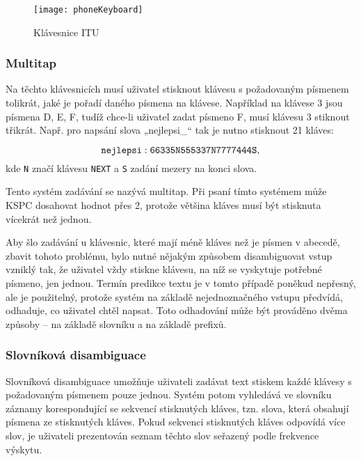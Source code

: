 \documentclass[a4paper,11pt]{article}
\begin{document}
\begin{figure}[h]
	\centering
	\texttt{[image: phoneKeyboard]}
	\caption{Klávesnice ITU}
	\label{fig:phoneKeyboard}
\end{figure}

\subsubsection{Multitap}

Na těchto klávesnicích musí uživatel stisknout klávesu s požadovaným písmenem tolikrát, jaké je pořadí daného písmena na klávese. Například na klávese 3 jsou písmena D, E, F, tudíž chce-li uživatel zadat písmeno F, musí klávesu 3 stiknout třikrát. Např. pro napsání slova „nejlepsi\_“ tak je nutno stisknout 21 kláves:

\[
	{\tt nejlepsi: 66335N555337N7777444S},
\]
kde {\tt N} značí klávesu {\tt NEXT} a {\tt S} zadání mezery na konci slova.

Tento systém zadávání se nazývá multitap. Při psaní tímto systémem může KSPC dosahovat hodnot přes 2, protože většina kláves musí být stisknuta vícekrát než jednou. \parencite[202]{mackenzie2002kspc}

Aby šlo zadávání u klávesnic, které mají méně kláves než je písmen v abecedě, zbavit tohoto problému, bylo nutné nějakým způsobem disambiguovat vstup vzniklý tak, že uživatel vždy stiskne klávesu, na níž se vyskytuje potřebné písmeno, jen jednou. Termín predikce textu je v tomto případě poněkud nepřesný, ale je použitelný, protože systém na základě nejednoznačného vstupu předvídá, odhaduje, co uživatel chtěl napsat. Toto odhadování může být prováděno dvěma způsoby -- na základě slovníku a na základě prefixů.

\subsubsection{Slovníková disambiguace}

Slovníková disambiguace umožňuje uživateli zadávat text stiskem každé klávesy s požadovaným písmenem pouze jednou. Systém potom vyhledává ve slovníku záznamy korespondující se sekvencí stisknutých kláves, tzn. slova, která obsahují písmena ze stisknutých kláves. Pokud sekvenci stisknutých kláves odpovídá více slov, je uživateli prezentován seznam těchto slov seřazený podle frekvence výskytu. %
\end{document}
